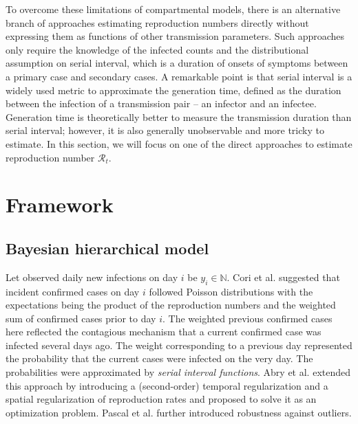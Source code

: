 \documentclass[10pt,letterpaper]{article}
\def\calR{\mathcal{R}}
\def\bbN{\mathbb{N}}
\begin{document}
To overcome these limitations of compartmental models, there is an alternative branch of approaches estimating reproduction numbers directly without expressing them as functions of other transmission parameters. Such approaches only require the knowledge of the infected counts and the distributional assumption on serial interval, which is a duration of onsets of symptoms between a primary case and secondary cases. A remarkable point is that serial interval is a widely used metric to approximate the generation time, defined as the duration between the infection of a transmission pair -- an infector and an infectee. Generation time is theoretically better to measure the transmission duration than serial interval; however, it is also generally unobservable and more tricky to estimate. In this section, we will focus on one of the direct approaches to estimate reproduction number $\calR_t$. 

\section*{Framework}


\subsection*{Bayesian hierarchical model} 

Let observed daily new infections on day $i$ be $y_i \in \bbN$. 
Cori et al. \cite{cori2013new} suggested that incident confirmed cases on day $i$ followed Poisson distributions with the expectations being the product of the reproduction numbers and the weighted sum of confirmed cases prior to day $i$. The weighted previous confirmed cases here reflected the contagious mechanism that a current confirmed case was infected several days ago. The weight corresponding to a previous day represented the probability that the current cases were infected on the very day. The probabilities were approximated by \textit{serial interval functions}. %
Abry et al. \cite{abry2020spatial} extended this approach by introducing a (second-order) temporal regularization and a spatial regularization of reproduction rates and proposed to solve it as an optimization problem. %
Pascal et al. \cite{pascal2022nonsmooth} further introduced robustness against outliers.
\end{document}
